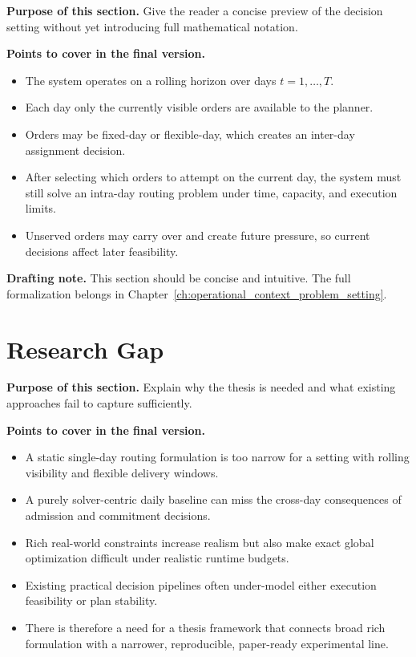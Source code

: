 \textbf{Purpose of this section.}
Give the reader a concise preview of the decision setting without yet introducing full mathematical notation.

\textbf{Points to cover in the final version.}
\begin{itemize}
    \item The system operates on a rolling horizon over days \(t = 1, \dots, T\).
    \item Each day only the currently visible orders are available to the planner.
    \item Orders may be fixed-day or flexible-day, which creates an inter-day assignment decision.
    \item After selecting which orders to attempt on the current day, the system must still solve an intra-day routing problem under time, capacity, and execution limits.
    \item Unserved orders may carry over and create future pressure, so current decisions affect later feasibility.
\end{itemize}

\textbf{Drafting note.}
This section should be concise and intuitive.
The full formalization belongs in Chapter~\ref{ch:operational_context_problem_setting}.

\section{Research Gap}
\label{sec:intro:gap}

\textbf{Purpose of this section.}
Explain why the thesis is needed and what existing approaches fail to capture sufficiently.

\textbf{Points to cover in the final version.}
\begin{itemize}
    \item A static single-day routing formulation is too narrow for a setting with rolling visibility and flexible delivery windows.
    \item A purely solver-centric daily baseline can miss the cross-day consequences of admission and commitment decisions.
    \item Rich real-world constraints increase realism but also make exact global optimization difficult under realistic runtime budgets.
    \item Existing practical decision pipelines often under-model either execution feasibility or plan stability.
    \item There is therefore a need for a thesis framework that connects broad rich formulation with a narrower, reproducible, paper-ready experimental line.
\end{itemize}

